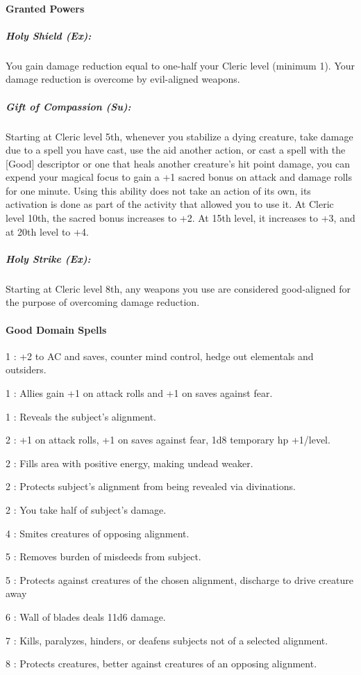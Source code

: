 \paragraph{Granted Powers}
\subparagraph{Holy Shield (Ex):}You gain damage reduction equal to one-half your Cleric level (minimum 1).
Your damage reduction is overcome by evil-aligned weapons.

\subparagraph{Gift of Compassion (Su):}
Starting at Cleric level 5th, whenever you stabilize a dying creature, take damage due to a  spell you have cast, 
use the aid another action, or cast a spell with the [Good] descriptor or one that heals another creature's hit point damage, 
you can expend your magical focus to gain a +1 sacred bonus on attack and damage rolls for one minute.
Using this ability does not take an action of its own, its activation is done as part of the activity that allowed you to use it.
At Cleric level 10th, the sacred bonus increases to +2. At 15th level, it increases to +3, and at 20th level to +4.

\subparagraph{Holy Strike (Ex):}
Starting at Cleric level 8th, any weapons you use are considered good-aligned for the purpose of overcoming damage reduction.
\paragraph{Good Domain Spells}
\begin{list}{}{\leftmargin=1em}
\item[1] : +2 to AC and saves, counter mind control, hedge out elementals and outsiders.
\item[1] : Allies gain +1 on attack rolls and +1 on saves against fear.
\item[1] : Reveals the subject's alignment.
\item[2] : +1 on attack rolls, +1 on saves against fear, 1d8 temporary hp +1/level.
\item[2] : Fills area with positive energy, making undead weaker.
\item[2] : Protects subject's alignment from being revealed via divinations.
\item[2] : You take half of subject's damage.
\item[4] : Smites creatures of opposing alignment.
\item[5] : Removes burden of misdeeds from subject.
\item[5] : Protects against creatures of the chosen alignment, discharge to drive creature away
\item[6] : Wall of blades deals 11d6 damage.
\item[7] : Kills, paralyzes, hinders, or deafens subjects not of a selected alignment.
\item[8] : Protects creatures, better against creatures of an opposing alignment.
\end{list}

